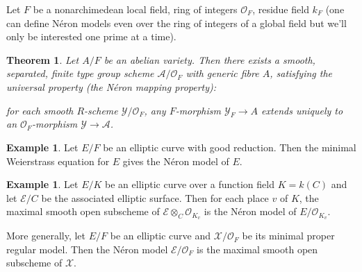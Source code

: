 \documentclass[12pt]{amsart}
\numberwithin{equation}{section}
\newtheorem{theorem}[equation]{Theorem}
\theoremstyle{remark}
\theoremstyle{definition}
\newtheorem{example}[equation]{Example}
\theoremstyle{definition}
\theoremstyle{definition}
\theoremstyle{definition}
\theoremstyle{definition}
\theoremstyle{definition}
\theoremstyle{definition}
\begin{document}
Let $F$ be a nonarchimedean local field, ring of integers $\mathcal{O}_F$, residue field $k_F$ (one can define N\'{e}ron models even over the ring of integers of a global field but we'll only be interested one prime at a time).

\begin{theorem}
Let $A/F$ be an abelian variety. Then there exists a smooth, separated, finite type group scheme $\mathcal{A}/\mathcal{O}_F$ with generic fibre $A$, satisfying the universal property (the \emph{N\'{e}ron mapping property}):

for each smooth $R$-scheme $\mathcal{Y}/\mathcal{O}_F$, any $F$-morphism $\mathcal{Y}_F\rightarrow A$ extends uniquely to an $\mathcal{O}_F$-morphism $\mathcal{Y}\rightarrow \mathcal{A}$.
\end{theorem} 

\begin{example}
Let $E/F$ be an elliptic curve with good reduction. Then the minimal Weierstrass equation for $E$ gives the N\'{e}ron model of $E$.  
\end{example}

\begin{example}
Let $E/K$ be an elliptic curve over a function field $K=k(C)$ and let $\mathcal{E}/C$ be the associated elliptic surface. Then for each place $v$ of $K$, the maximal smooth open subscheme of $\mathcal{E}\otimes_C \mathcal{O}_{K_v}$ is the N\'{e}ron model of $E/\mathcal{O}_{K_v}$.  

More generally, let $E/F$ be an elliptic curve and $\mathcal{X}/\mathcal{O}_F$ be its minimal proper regular model. Then the N\'{e}ron model $\mathcal{E}/\mathcal{O}_F$ is the maximal smooth open subscheme of $\mathcal{X}$.
\end{example}
\end{document}
